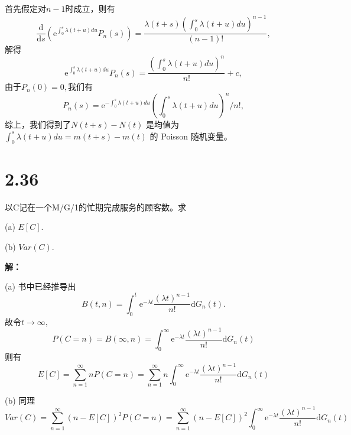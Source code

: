 \documentclass[12pt]{article}
\begin{document}
首先假定对\(n-1\)时成立，则有
$$\frac{\mathrm{d}}{\mathrm{d}s}(\mathrm{e}^{\int_0^s\lambda(t+u)du}P_n(s))=\frac{\lambda(t+s)(\int_0^s\lambda(t+u)du)^{n-1}}{(n-1)!},$$
解得$$\mathrm{e}^{\int_0^s\lambda(t+u)du}P_n(s)=\frac{(\int_0^s\lambda(t+u)du)^n}{n!}+c,$$
由于\(P_n(0)=0,\)我们有$$P_n(s)=\mathrm{e}^{-\int_0^s\lambda(t+u)du }(\int_0^s\lambda(t+u)du)^n/n!,$$
综上，我们得到了$N(t + s) - N(t)$ 是均值为 $\int_0^s\lambda(t+u)du=m(t + s) - m(t)$ 的 Poisson 随机变量。
\section*{2.36}
以C记在一个M/G/1的忙期完成服务的顾客数。求

(a) $E[C].$

(b) $ Var(C).$

\textbf{解：}

(a)
书中已经推导出$$B(t,n)=\int_0^t\mathrm{e}^{-\lambda t}\frac{(\lambda t)^{n-1}}{n!}\mathrm{d}G_n(t).$$
故令\(t\to\infty,\)
\[P(C=n)=B(\infty,n)=\int_0^\infty\mathrm{e}^{-\lambda t}\frac{(\lambda t)^{n-1}}{n!}\mathrm{d}G_n(t)\]
则有\[E[C]=\sum_{n=1}^\infty nP(C=n)=\sum_{n=1}^\infty n\int_0^\infty\mathrm{e}^{-\lambda t}\frac{(\lambda t)^{n-1}}{n!}\mathrm{d}G_n(t)\]

(b) 同理\[Var(C)=\sum_{n=1}^\infty (n-E[C])^2P(C=n)=\sum_{n=1}^\infty (n-E[C])^2\int_0^\infty\mathrm{e}^{-\lambda t}\frac{(\lambda t)^{n-1}}{n!}\mathrm{d}G_n(t)\]
\end{document}
